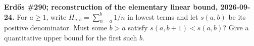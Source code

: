 \textbf{Erd\H{o}s \#290; reconstruction of the elementary linear bound, 2026-09-24.}
For $a\geq1$, write $H_{a,b}=\sum_{n=a}^b1/n$ in lowest terms and let $s(a,b)$ be its positive denominator. Must some $b>a$ satisfy $s(a,b+1)<s(a,b)$? Give a quantitative upper bound for the first such $b$.
